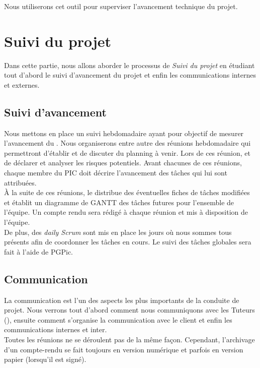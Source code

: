 Nous utiliserons cet outil pour superviser l'avancement technique du projet.

\section{Suivi du projet} 

Dans cette partie, nous allons aborder le processus de \textit{Suivi du projet} en étudiant tout d'abord le suivi d'avancement du projet et enfin les communications internes et externes.  

\subsection{Suivi d'avancement}

Nous mettons en place un suivi hebdomadaire ayant pour objectif de mesurer l'avancement du \PICCourt. Nous organiserons entre autre des réunions hebdomadaire qui permettront d'établir et de discuter du planning à venir. Lors de ces réunion,  et de déclarer et analyser les risques potentiels. Avant chacunes de ces réunions, chaque membre du PIC doit décrire l'avancement des tâches qui lui sont attribuées.\\

À la suite de ces réunions, le \CP{} distribue des éventuelles fiches de tâches modifiées et établit un diagramme de GANTT des tâches futures pour l'ensemble de l'équipe. Un compte rendu sera rédigé à chaque réunion et mis à disposition de l'équipe. \\

De plus, des \textit{daily Scrum} sont mis en place les jours où nous sommes tous présents afin de coordonner les tâches en cours. Le suivi des tâches globales sera fait à l’aide de PGPic.

\subsection{Communication}

La communication est l'un des aspects les plus importants de la conduite de projet. Nous verrons tout d'abord comment nous communiquons avec les Tuteurs (\tuteurPedagogique \tuteurQualite), ensuite comment s'organise la communication avec le client et enfin les communications internes et inter\PICCourt.\\ 

Toutes les réunions ne se déroulent pas de la même façon. Cependant, l’archivage d’un compte-rendu se fait toujours en version numérique et parfois en version papier (lorsqu’il est signé).

